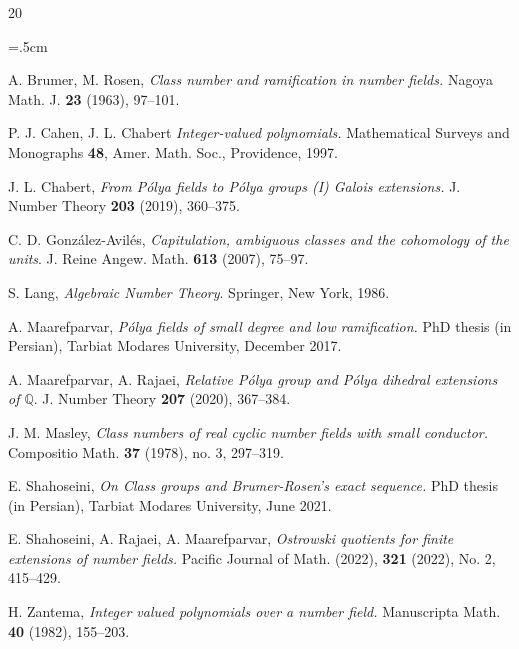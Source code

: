 \documentclass{amsart}
\theoremstyle{definition}
\numberwithin{equation}{section}
\begin{document}


\begin{thebibliography}{20}
	
	\baselineskip=.5cm
	
	
	 A. Brumer, M. Rosen, \textit{Class number and ramification in number fields.} Nagoya Math. J. \textbf{23} (1963), 97--101.
	
	
	 P. J. Cahen, J. L. Chabert \textit{Integer-valued polynomials.} Mathematical Surveys and Monographs \textbf{48}, Amer. Math. Soc., Providence, 1997.
	
	
	 J. L. Chabert, \textit{From P\'olya fields to P\'olya groups (I) Galois extensions.} J. Number Theory \textbf{203} (2019), 360--375.
	
	
	
 C. D. Gonz\'alez-Avil\'es,  \textit{Capitulation, ambiguous classes and the cohomology of the units}. J. Reine Angew. Math. \textbf{613} (2007), 75--97.
	

 S. Lang, \textit{Algebraic Number Theory}. Springer, New York, 1986.
	
	
	 A. Maarefparvar, \textit{P\'olya fields of small degree and low ramification.} PhD thesis (in Persian), Tarbiat Modares University, December 2017.

	
	
	 A. Maarefparvar, A. Rajaei, \textit{Relative P\'olya group and P\'olya dihedral extensions of $\mathbb{Q}$}. J. Number Theory \textbf{207} (2020), 367--384.
	
	
	 J. M. Masley, \textit{Class numbers of real cyclic number fields with small conductor.} Compositio Math. \textbf{37} (1978), no. 3, 297--319.
	
	
	
	 E. Shahoseini, \textit{On Class groups and Brumer-Rosen's exact sequence.} PhD thesis (in Persian), Tarbiat Modares University, June 2021.
	
 E. Shahoseini, A. Rajaei, A. Maarefparvar, \textit{Ostrowski quotients for finite extensions of number fields.} Pacific Journal of Math. (2022), \textbf{321} (2022), No. 2, 415--429.
	
	

	
	
	 H. Zantema, \textit{Integer valued polynomials over a number field.} Manuscripta Math. \textbf{40} (1982), 155--203. 
	
\end{thebibliography}
\end{document}
